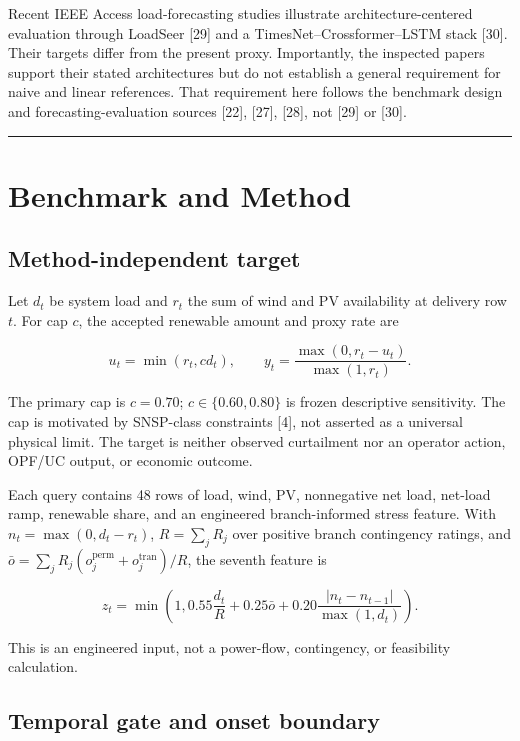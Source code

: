 \documentclass{ieeeaccess}
\begin{document}
Recent IEEE Access load-forecasting studies illustrate architecture-centered evaluation through LoadSeer {[}29{]} and a TimesNet--Crossformer--LSTM stack {[}30{]}. Their targets differ from the present proxy. Importantly, the inspected papers support their stated architectures but do not establish a general requirement for naive and linear references. That requirement here follows the benchmark design and forecasting-evaluation sources {[}22{]}, {[}27{]}, {[}28{]}, not {[}29{]} or {[}30{]}.

\begin{center}\rule{0.5\linewidth}{0.5pt}\end{center}

\section{Benchmark and Method}\label{benchmark-and-method}

\subsection{Method-independent target}\label{method-independent-target}

Let \(d_t\) be system load and \(r_t\) the sum of wind and PV availability at delivery row \(t\). For cap \(c\), the accepted renewable amount and proxy rate are

\[
u_t=\min(r_t,cd_t),\qquad
y_t=\frac{\max(0,r_t-u_t)}{\max(1,r_t)}.
\]

The primary cap is \(c=0.70\); \(c\in\{0.60,0.80\}\) is frozen descriptive sensitivity. The cap is motivated by SNSP-class constraints {[}4{]}, not asserted as a universal physical limit. The target is neither observed curtailment nor an operator action, OPF/UC output, or economic outcome.

Each query contains 48 rows of load, wind, PV, nonnegative net load, net-load ramp, renewable share, and an engineered branch-informed stress feature. With \(n_t=\max(0,d_t-r_t)\), \(R=\sum_j R_j\) over positive branch contingency ratings, and \(\bar o=\sum_jR_j(o_j^{\mathrm{perm}}+o_j^{\mathrm{tran}})/R\), the seventh feature is

\[
z_t=\min\!\left(1,0.55\frac{d_t}{R}+0.25\bar o+0.20\frac{|n_t-n_{t-1}|}{\max(1,d_t)}\right).
\]

This is an engineered input, not a power-flow, contingency, or feasibility calculation.

\subsection{Temporal gate and onset boundary}\label{temporal-gate-and-onset-boundary}
\end{document}
